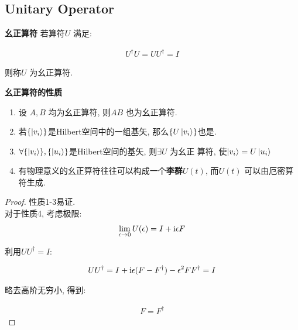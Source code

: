 \subsection{Unitary Operator}

\begin{definition}{\bf 幺正算符}
  若算符$U$ 满足:

  \begin{equation}
    \begin{aligned}
      U^{\dagger} U = U U^{\dagger} = I
    \end{aligned}
  \end{equation}

  则称$U$ 为幺正算符.
\end{definition}

\begin{theorem}{\bf 幺正算符的性质}
  \begin{enumerate}
    \item 设 $A,B$ 均为幺正算符, 则$AB$ 也为幺正算符.
    \item 若$\{\ket{v_{i}}\}$是Hilbert空间中的一组基矢, 那么$\{U\ket{v_{i}}\}$也是.
    \item $\forall \{\ket{v_{i}}\},\{\ket{u_{i}}\}$是Hilbert空间的基矢, 则$\exists U$ 为幺正
      算符, 使$\ket{v_{i}} = U \ket{u_{i}}$
    \item 有物理意义的幺正算符往往可以构成一个{\bf 李群}$U(t)$, 而$U(t)$ 可以由厄密算符生成.
  \end{enumerate}
\end{theorem}

\begin{proof}
  性质1-3易证.\\
  对于性质4, 考虑极限:
  \begin{equation}
    \begin{aligned}
      \lim_{\epsilon\to 0} U(\epsilon) = I + {\rm i}\epsilon F
    \end{aligned}
  \end{equation}

  利用$UU^{\dagger}=I$:

  \begin{equation}
    \begin{aligned}
      UU^{\dagger} = I + {\rm i}\epsilon(F - F^{\dagger}) - \epsilon^{2}FF^{\dagger} = I
    \end{aligned}
  \end{equation}

  略去高阶无穷小, 得到:

  \begin{equation}
    \begin{aligned}
      F = F^{\dagger}
    \end{aligned}
  \end{equation}
\end{proof}

